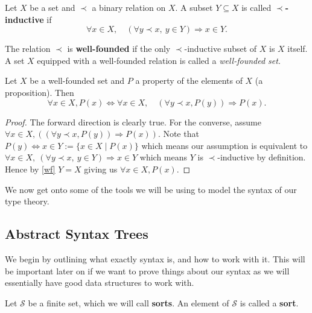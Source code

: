 \begin{defin}
    Let $X$ be a set and $\prec$ a binary relation on $X$. A subset $Y \subseteq X$ is called \textbf{$\prec$-inductive} if
    $$
        \forall x \in X, \quad (\forall y \prec x,\ y \in Y) \Rightarrow x \in Y.
    $$
\end{defin}

\begin{defin}\label{wf}
    The relation $\prec$ is \textbf{well-founded} if the only $\prec$-inductive subset of $X$ is $X$ itself. A set $X$ equipped with a well-founded relation is called a \textit{well-founded set}.
\end{defin}

\begin{theorem}
    Let $X$ be a well-founded set and $P$ a property of the elements of $X$ (a proposition). Then
    $$
        \forall x \in X, P(x) \Leftrightarrow \forall x \in X,\quad (\forall y \prec x, P(y)) \Rightarrow P(x).
    $$
\end{theorem}
\begin{proof}
    The forward direction is clearly true. For the converse, assume $\forall x \in X,((\forall y \prec x, P(y)) \Rightarrow P(x))$. Note that $P(y) \Leftrightarrow x \in Y := \{ x \in X \mid P(x)\} $ which means our assumption is equivalent to $\forall x \in X,\ (\forall y \prec x,\ y \in Y) \Rightarrow x \in Y$ which means $Y$ is $\prec$-inductive by definition. Hence by \ref{wf} $Y=X$ giving us $ \forall x \in X, P(x)$.
\end{proof}

We now get onto some of the tools we will be using to model the syntax of our type theory. 

\subsection{Abstract Syntax Trees}

We begin by outlining what exactly syntax is, and how to work with it. This will be important later on if we want to prove things about our syntax as we will essentially have good data structures to work with.


\begin{defin}[Sorts]
    Let $\mathcal{S}$ be a finite set, which we will call \textbf{sorts}. An element of $\mathcal{S}$ is called a \textbf {sort}.
\end{defin}

